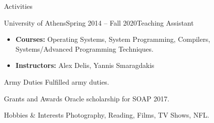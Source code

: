 \documentclass{resume}
\begin{document}
\begin{rSection}{Activities}
  \begin{rSubsection}{University of Athens}{Spring 2014 -- Fall 2020}{Teaching Assistant}{}
    \begin{itemize}[label={\color{accent}\textbullet}, leftmargin=1.5em, topsep=2pt]
      \setlength\itemsep{-0.2em}
        \item {\bf Courses:}  Operating Systems, System Programming, Compilers, Systems/Advanced Programming Techniques.
        \item {\bf Instructors:} Alex Delis, Yannis Smaragdakis
      \end{itemize}
    \end{rSubsection}
\end{rSection}

\begin{rSection}{Army Duties}
Fulfilled army duties.
\end{rSection}

\begin{rSection}{Grants and Awards}
  Oracle scholarship for SOAP 2017.
\end{rSection}

\begin{rSection}{Hobbies \& Interests}
  Photography, Reading, Films, TV Shows, NFL.
\end{rSection}
\end{document}
